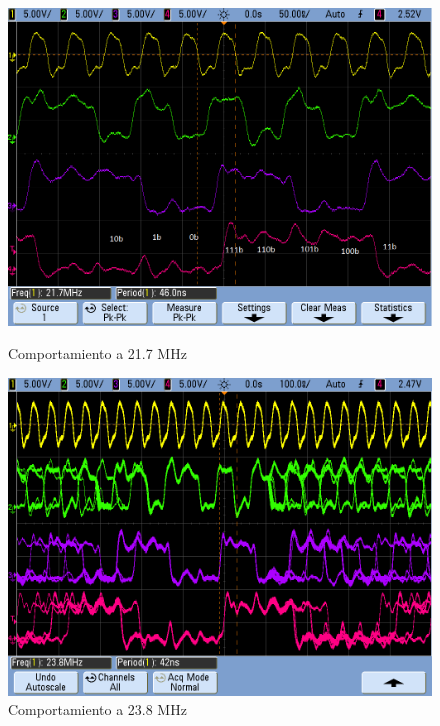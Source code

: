 \begin{figure}[H]
\begin{center}  
  \begin{minipage}[b]{0.4\textwidth}
    \begin{center}
  		\includegraphics[scale=0.2]{ejercicio7/imagenes/async3.png}
	\end{center}
  \caption{Comportamiento a 21.7 MHz}
  \label{7_fig6}
 \end{minipage}
   \begin{minipage}[b]{0.4\textwidth}
    \begin{center}
  		\includegraphics[scale=0.2]{ejercicio7/imagenes/async4.png}
	\end{center}
  \caption{Comportamiento a 23.8 MHz}
  \label{7_fig7}
 \end{minipage}
\end{center}
\end{figure}

